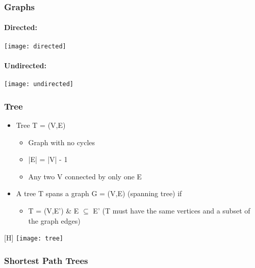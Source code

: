 \documentclass[../resumosRCOM.tex]{subfiles}
\begin{document}
 

\subsubsection{Graphs}

\paragraph{Directed:}

\begin{center}
    \texttt{[image: directed]}
\end{center}

\paragraph{Undirected:}

\begin{center}
    \texttt{[image: undirected]}
\end{center}

\subsubsection{Tree}

\begin{itemize}
    \item Tree T = (V,E)
    \begin{itemize}
        \item Graph with no cycles
        \item |E| = |V| - 1
        \item Any two V connected by only one E
    \end{itemize}
    \item A tree T spans a graph G = (V,E) (spanning tree) if
    \begin{itemize}
        \item T = (V,E') \& E $\subseteq$ E' (T must have the same vertices and a subset of the graph edges)
    \end{itemize}
\end{itemize}

\begin{center}[H]
    \texttt{[image: tree]}
\end{center}

\subsubsection{Shortest Path Trees}
\end{document}
